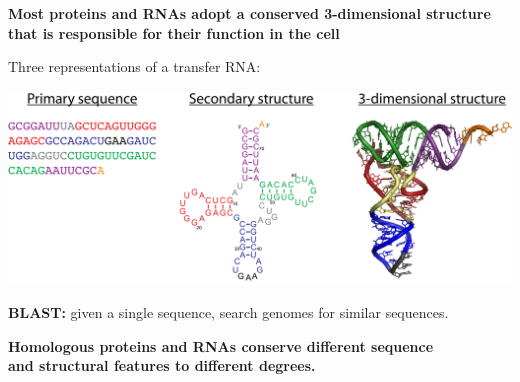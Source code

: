 \documentclass[landscape]{slides}
\begin{document}
\begin{slide}
\begin{center}
{\bf Most proteins and RNAs adopt a conserved 3-dimensional 
  structure that is responsible for their function in the cell}

\medskip

Three representations of a transfer RNA:

\includegraphics[width=9in]{figs/trna-123}

{\bf BLAST:} given a single sequence, search genomes for similar sequences.


{\bf Homologous proteins and RNAs conserve different sequence \\
and structural features to different degrees.}
\end{center}

\vfill

\end{slide}
\end{document}
